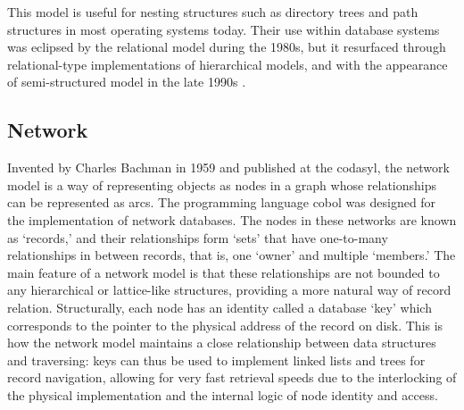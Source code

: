 This model is useful for nesting structures such as directory trees and path structures in most operating systems today. Their use within database systems was eclipsed by the relational model during the 1980s, but it resurfaced through relational-type implementations of hierarchical models, and with the appearance of semi-structured model in the late 1990s .

\subsection{Network}
\label{model:network}


Invented by Charles Bachman in 1959 and published at the \gls{codasyl}, the network model is a way of representing objects as nodes in a graph whose relationships can be represented as arcs. The programming language \gls{cobol} was designed for the implementation of network databases. The nodes in these networks are known as `records,' and their relationships form `sets' that have one-to-many relationships in between records, that is, one `owner' and multiple `members.' The main feature of a network model is that these relationships are not bounded to any hierarchical or lattice-like structures, providing a more natural way of record relation. Structurally, each node has an identity called a database `key' which corresponds to the pointer to the physical address of the record on disk. This is how the network model maintains a close relationship between data structures and traversing: keys can thus be used to implement linked lists and trees for record navigation, allowing for very fast retrieval speeds due to the interlocking of the physical implementation and the internal logic of node identity and access.

